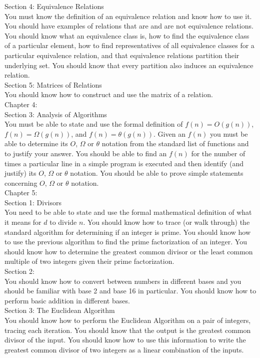\documentclass[12pt]{article}
\begin{document}
Section 4: Equivalence Relations\\
You must know the definition of an equivalence relation and know how to use it. You should have examples of relations that are and are not equivalence relations. You should know what an equivalence class is, how to find the equivalence class of a particular element, how to find representatives of all equivalence classes for a particular equivalence relation, and that equivalence relations partition their underlying set.  You should know that every partition also induces an equivalence relation.\\

Section 5: Matrices of Relations\\
You should know  how to construct and use the matrix of a relation.\\

Chapter 4:\\
Section 3: Analysis of Algorithms\\
You must be able to state and use the formal definition of $f(n)=O(g(n))$, $f(n)=\Omega(g(n))$, and $f(n)=\theta(g(n))$. Given an $f(n)$ you must be able to determine its $O$, $\Omega$ or $\theta$ notation from the standard list of functions and to justify your answer. You should be able to find an $f(n)$ for the number of times a particular line in a simple program is executed and then identify (and justify) its $O$, $\Omega$ or $\theta$ notation. You should be able to prove simple statements concerning $O$, $\Omega$ or $\theta$ notation.\\

Chapter 5:\\
Section 1: Divisors\\
You need to be able to state and use the formal mathematical definition of what it means for $d$ to divide $n.$ You should know how to trace (or walk through) the standard algorithm for determining if an integer is prime. You should know how to use the previous algorithm to find the prime factorization of an integer. You should know how to determine the greatest common divisor or the least common multiple of two integers given their prime factorization.\\

Section 2:\\
You should know how to convert between numbers in different bases and you should be familiar with base 2 and base 16 in particular. You should know how to perform basic addition in different bases.\\

Section 3: The Euclidean Algorithm\\
You should know how to perform the Euclidean Algorithm on a pair of integers, tracing each iteration. You should know that the output is the greatest common divisor of the input. You should know how to use this information to write the greatest common divisor of two integers as a linear combination of the inputs.
\end{document}

